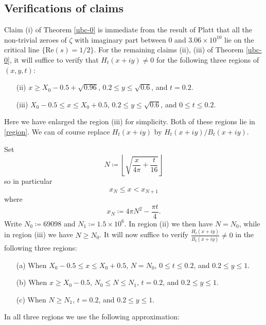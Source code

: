 \documentclass[a4paper,11pt,twoside]{amsart}
\begin{document}
\subsection{Verifications of claims}

Claim (i) of Theorem \ref{ubc-0} is immediate from the result of Platt \cite{platt} that all the non-trivial zeroes of $\zeta$ with imaginary part between $0$ and $3.06 \times 10^{10}$ lie on the critical line $\{ \mathrm{Re}(s) = 1/2\}$.  For the remaining claims (ii), (iii) of Theorem \ref{ubc-0}, it will suffice to verify that $H_t(x+iy) \neq 0$ for the following three regions of $(x,y,t)$:
\begin{itemize}
\item[(ii)]  $x \geq X_0 - 0.5 + \sqrt{0.96}$, $0.2 \leq y \leq \sqrt{0.6}$, and $t = 0.2$. 
\item[(iii)]  $X_0 - 0.5 \leq x \leq X_0 + 0.5$, $0.2 \leq y \leq \sqrt{0.6}$, and $0 \leq t \leq 0.2$.
\end{itemize}
Here we have enlarged the region (iii) for simplicity.  Both of these regions lie in \eqref{region}.  We can of course replace $H_t(x+iy)$ by $H_t(x+iy)/B_t(x+iy)$.  

Set
$$ N \coloneqq \left\lfloor \sqrt{\frac{x}{4\pi} + \frac{t}{16}} \right\rfloor $$ %
so in particular
\begin{equation}\label{xnn}
 x_N \leq x < x_{N+1}
\end{equation}
where
$$ x_N \coloneqq 4 \pi N^2 - \frac{\pi t}{4}.$$
Write $N_0 \coloneqq 69098$ and $N_1 \coloneqq 1.5 \times 10^6$.
In region (ii) we then have $N = N_0$, while in region (iii) we have $N \geq N_0$.  It will now suffice to verify $\frac{H_t(x+iy)}{B_t(x+iy)} \neq 0$ in the following three regions:
\begin{itemize}
\item[(a)]  When $X_0 - 0.5 \leq x \leq X_0 + 0.5$, $N = N_0$, $0 \leq t \leq 0.2$, and $0.2 \leq y \leq 1$.
\item[(b)]  When $x \geq X_0 - 0.5$, $N_0 \leq N \leq N_1$, $t = 0.2$, and $0.2 \leq y \leq 1$.
\item[(c)]  When $N \geq N_1$, $t = 0.2$, and $0.2 \leq y \leq 1$.
\end{itemize}

In all three regions we use the following approximation:
\end{document}
